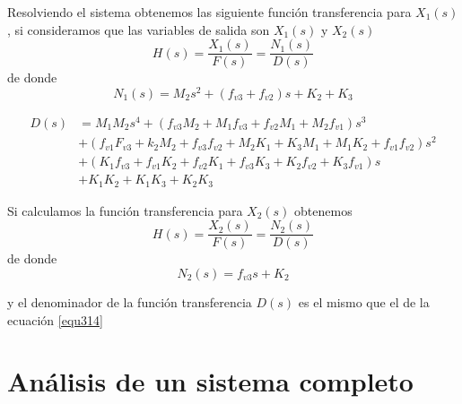 \documentclass[12pt]{book}
\theoremstyle{definition}
\theoremstyle{remark}
\theoremstyle{plain}
\begin{document}
Resolviendo el sistema obtenemos las siguiente función transferencia para $X_1(s)$, si consideramos que  las variables de salida son $X_1(s)$ y $X_2(s)$
\begin{equation}
\label{equ312}
H(s)= \frac{X_1(s)}{F(s)}=\frac{N_1(s)}{D(s)}
\end{equation}
de donde
\begin{equation*}
N_1(s)= M_2 s^2+(f_{v3}+f_{v2}) s +K_2+K_3
\end{equation*}

\begin{equation}
\label{equ313}
\begin{split}
D(s) &= M_1 M_2 s^4 + (f_{v3} M_2+M_1 f_{v3}+f_{v2}M_1+M_2 f_{v1}) s^3 \\
&+ (f_{v1}F_{v3} +k_2 M_2+f_{v3}f_{v2}+M_2 K_1+K_3 M_1+M_1 K_2+f_{v1} f_{v2}) s^2 \\
&+(K_1 f_{v3}+f_{v1} K_2+f_{v2} K_1 +f_{v3} K_3+K_2 f_{v2}+K_3 f_{v1}) s \\
&+K_1 K_2+K_1 K_3+K_2 K_3
\end{split}
\end{equation}

Si calculamos la función transferencia para $X_2(s)$ obtenemos
\begin{equation}
\label{equ314}
H(s)= \frac{X_2(s)}{F(s)}=\frac{N_2(s)}{D(s)}
\end{equation}
de donde
\begin{equation*}
N_2(s)= f_{v3} s +K_2
\end{equation*}

y el denominador de la función transferencia $D(s)$ es el mismo que el de la ecuación \ref{equ314}

\chapter{Análisis de un sistema completo}




\backmatter
\end{document}
